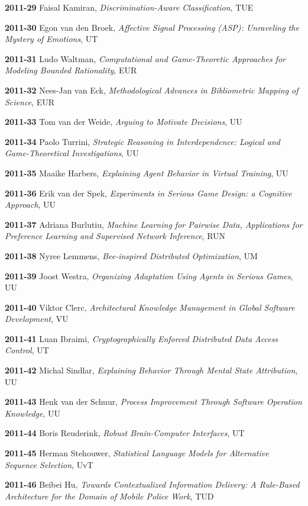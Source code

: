 \begin{multicols}{2}
\textbf{2011-29}   Faisal Kamiran, \textit{Discrimination-Aware Classification}, TUE

\textbf{2011-30}   Egon van den Broek, \textit{Affective Signal Processing (ASP): Unraveling the Mystery of Emotions}, UT

\textbf{2011-31}   Ludo Waltman, \textit{Computational and Game-Theoretic Approaches for Modeling Bounded Rationality}, EUR

\textbf{2011-32}   Nees-Jan van Eck, \textit{Methodological Advances in Bibliometric Mapping of Science}, EUR

\textbf{2011-33}   Tom van der Weide, \textit{Arguing to Motivate Decisions}, UU

\textbf{2011-34}   Paolo Turrini,  \textit{Strategic Reasoning in Interdependence: Logical and Game-Theoretical Investigations}, UU
 
\textbf{2011-35}   Maaike Harbers, \textit{Explaining Agent Behavior in Virtual Training}, UU

\textbf{2011-36}   Erik van der Spek, \textit{Experiments in Serious Game Design: a Cognitive Approach}, UU

\textbf{2011-37}   Adriana Burlutiu, \textit{Machine Learning for Pairwise Data, Applications for Preference Learning and Supervised Network Inference}, RUN

\textbf{2011-38}   Nyree Lemmens, \textit{Bee-inspired Distributed Optimization}, UM

\textbf{2011-39}   Joost Westra, \textit{Organizing Adaptation Using Agents in Serious Games}, UU

\textbf{2011-40}   Viktor Clerc, \textit{Architectural Knowledge Management in Global Software Development}, VU

\textbf{2011-41}   Luan Ibraimi, \textit{Cryptographically Enforced Distributed Data Access Control}, UT

\textbf{2011-42}   Michal Sindlar, \textit{Explaining Behavior Through Mental State Attribution}, UU

\textbf{2011-43}   Henk van der Schuur, \textit{Process Improvement Through Software Operation Knowledge}, UU

\textbf{2011-44}   Boris Reuderink,  \textit{Robust Brain-Computer Interfaces}, UT

\textbf{2011-45}   Herman Stehouwer, \textit{Statistical Language Models for Alternative Sequence Selection}, UvT

\textbf{2011-46}   Beibei Hu, \textit{Towards Contextualized Information Delivery: A Rule-Based Architecture for the Domain of Mobile Police Work}, TUD


\end{multicols}
